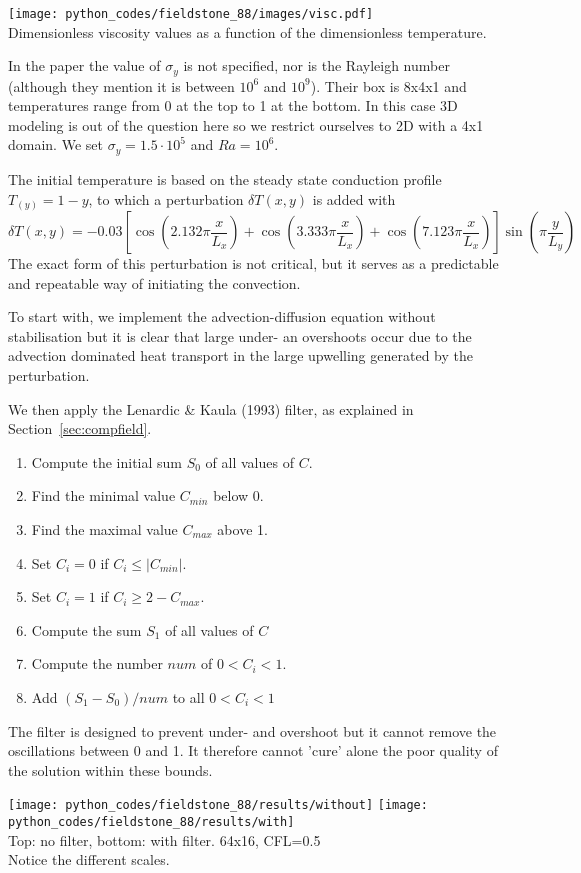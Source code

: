 \begin{center}
\texttt{[image: python\_codes/fieldstone\_88/images/visc.pdf]}\\
{\captionfont Dimensionless viscosity values as a function of the dimensionless temperature.}
\end{center}

In the paper the value of $\sigma_y$ is not specified, nor is the Rayleigh number (although 
they mention it is between $10^6$ and $10^9$).
Their box is 8x4x1 and temperatures range from 0 at the top to 1 at the bottom.
In this case 3D modeling is out of the question here so we restrict ourselves to 2D with a 4x1 domain. 
We set $\sigma_y=1.5\cdot 10^5$ and $Ra=10^6$.

The initial temperature is based on the steady state conduction profile $T_(y)=1-y$, to which a
perturbation $\delta T(x,y)$ is added with 
\[
\delta T(x,y) = -0.03 \left[ \cos\left(2.132\pi \frac{x}{L_x}\right)
+ \cos\left(3.333\pi  \frac{x}{L_x}\right)
+ \cos\left(7.123 \pi  \frac{x}{L_x} \right) \right] \sin \left(\pi  \frac{y}{L_y} \right)
\]
The exact form of this perturbation is not critical, but it serves as a predictable and repeatable way of 
initiating the convection.

To start with, we implement the advection-diffusion equation without stabilisation but it is clear that 
large under- an overshoots occur due to the advection dominated heat transport in the large upwelling 
generated by the perturbation.

We then apply the Lenardic \& Kaula (1993) \cite{leka93} filter, as explained in Section~\ref{sec:compfield}.
\begin{enumerate}
\item Compute the initial sum $S_0$ of all values of $C$.
\item Find the minimal value $C_{min}$ below 0.
\item Find the maximal value $C_{max}$ above 1.
\item Set $C_i=0$ if $C_i \leq |C_{min}|$.
\item Set $C_i=1$ if $C_i \geq 2-C_{max}$. 
\item Compute the sum $S_1$ of all values of $C$
\item Compute the number $num$ of $0 < C_i < 1$.
\item Add $(S_1-S_0)/num$ to all $0<C_i<1$
\end{enumerate}

The filter is designed to prevent under- and overshoot but it cannot remove the oscillations between 0 and 1.
It therefore cannot 'cure' alone the poor quality of the solution within these bounds.
\begin{center}
\texttt{[image: python\_codes/fieldstone\_88/results/without]}
\texttt{[image: python\_codes/fieldstone\_88/results/with]}\\
{\captionfont Top: no filter, bottom: with filter. 64x16, CFL=0.5\\ Notice the different scales.}
\end{center}

